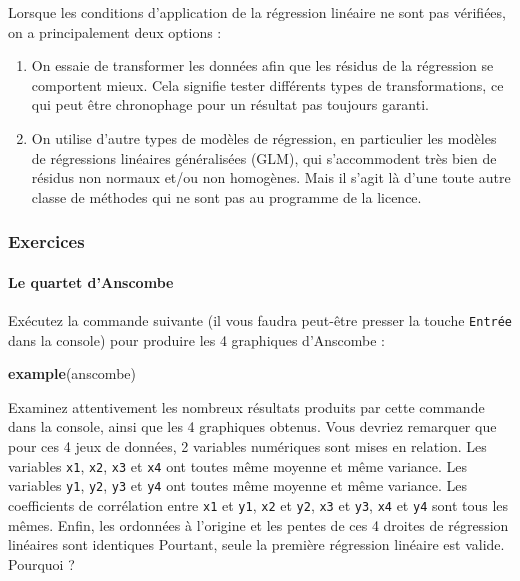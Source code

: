 \documentclass[a4paperpaper,]{article}
\newenvironment{Shaded}{\begin{snugshade}}{\end{snugshade}}
\newcommand{\KeywordTok}[1]{\textcolor[rgb]{0.12,0.11,0.11}{\textbf{#1}}}
\newcommand{\NormalTok}[1]{\textcolor[rgb]{0.12,0.11,0.11}{#1}}
\providecommand{\tightlist}{%
  \setlength{\itemsep}{0pt}\setlength{\parskip}{0pt}}
\let\oldparagraph\paragraph
\renewcommand{\paragraph}[1]{\oldparagraph{#1}\mbox{}}
\begin{document}
Lorsque les conditions d'application de la régression linéaire ne sont pas vérifiées, on a principalement deux options :

\begin{enumerate}
\def\labelenumi{\arabic{enumi}.}
\tightlist
\item
  On essaie de transformer les données afin que les résidus de la régression se comportent mieux. Cela signifie tester différents types de transformations, ce qui peut être chronophage pour un résultat pas toujours garanti.
\item
  On utilise d'autre types de modèles de régression, en particulier les modèles de régressions linéaires généralisées (GLM), qui s'accommodent très bien de résidus non normaux et/ou non homogènes. Mais il s'agit là d'une toute autre classe de méthodes qui ne sont pas au programme de la licence.
\end{enumerate}

\hypertarget{exercices-1}{%
\subsubsection{Exercices}\label{exercices-1}}

\hypertarget{le-quartet-danscombe}{%
\paragraph{Le quartet d'Anscombe}\label{le-quartet-danscombe}}

Exécutez la commande suivante (il vous faudra peut-être presser la touche \texttt{Entrée} dans la console) pour produire les 4 graphiques d'Anscombe :

\begin{Shaded}
\begin{Highlighting}[]
\KeywordTok{example}\NormalTok{(anscombe)}
\end{Highlighting}
\end{Shaded}

Examinez attentivement les nombreux résultats produits par cette commande dans la console, ainsi que les 4 graphiques obtenus. Vous devriez remarquer que pour ces 4 jeux de données, 2 variables numériques sont mises en relation. Les variables \texttt{x1}, \texttt{x2}, \texttt{x3} et \texttt{x4} ont toutes même moyenne et même variance. Les variables \texttt{y1}, \texttt{y2}, \texttt{y3} et \texttt{y4} ont toutes même moyenne et même variance. Les coefficients de corrélation entre \texttt{x1} et \texttt{y1}, \texttt{x2} et \texttt{y2}, \texttt{x3} et \texttt{y3}, \texttt{x4} et \texttt{y4} sont tous les mêmes. Enfin, les ordonnées à l'origine et les pentes de ces 4 droites de régression linéaires sont identiques Pourtant, seule la première régression linéaire est valide. Pourquoi ?
\end{document}
